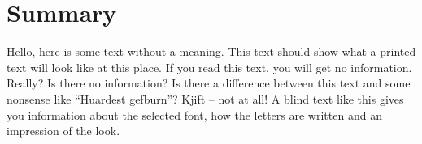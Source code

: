 \documentclass[11pt]{article}
\begin{document}
\vspace{1.5cm}

\section{\textcolor{section_1}{Summary}}
\vspace{-\parskip}
Hello, here is some text without a meaning. This text should show what a printed text will look like at this place. If you read this text, you will get no information. Really? Is there no information? Is there a difference between this text and some nonsense like “Huardest gefburn”? Kjift – not at all! A blind text like this gives you information about the selected font, how the letters are written and an impression of the look.\\

\vspace{-1em}
\end{document}
